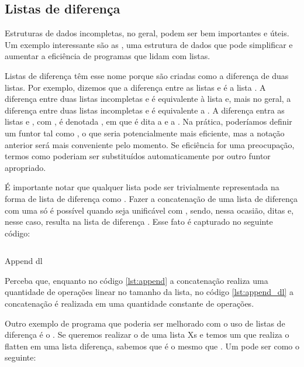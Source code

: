 \documentclass{article}
\begin{document}
\subsection{Listas de diferença}

Estruturas de dados incompletas, no geral, podem ser bem importantes e
úteis. Um exemplo interessante são as ,
uma estrutura de dados que pode simplificar e aumentar a eficiência de
programas que lidam com listas.

Listas de diferença têm esse nome porque são criadas como a diferença
de duas listas. Por exemplo, dizemos que a diferença entre as listas
\codigo{[a,b,c]} e \codigo{[c]} é a lista \codigo{[a,b]}. A diferença
entre duas listas incompletas \codigo{[a,b|Xs]} e  é
equivalente à lista \codigo{[a,b]} e, mais no geral, a diferença entre
duas listas incompletas \codigo{[$x_0$, ...,$x_i$|Xs]} e  é
equivalente a \codigo{[$x_0$, ...,$x_i$]}.  A diferença entra as
listas  e , com , é denotada
, em que  é dita a  e
 a . Na prática, poderíamos definir um
funtor tal como , o que seria potencialmente
mais eficiente, mas a notação anterior será mais conveniente pelo
momento. Se eficiência for uma preocupação, termos como
 poderiam ser substituídos automaticamente por
outro funtor apropriado.

É importante notar que qualquer lista  pode ser trivialmente
representada na forma de lista de diferença como
. Fazer a concatenação de uma lista de
diferença  com uma  só
é possível quando  seja unificável com , sendo, nessa
ocasião, ditas  e, nesse caso, resulta
na lista de diferença . Esse fato é capturado
no seguinte código:

\begin{listing}
  \inputminted{prolog}{../Exemplos/Cap3/prog5_concatenate_diff.pl}
  \caption{Append dl}\label{lst:append_dl}
\end{listing}

Perceba que, enquanto no código \ref{lst:append} a concatenação
realiza uma quantidade de operações linear no tamanho da lista, no
código \ref{lst:append_dl} a concatenação é realizada em uma
quantidade constante de operações.

Outro exemplo de programa que poderia ser melhorado com o uso de
listas de diferença é o . Se queremos realizar o
 de uma lista Xs e temos um 
que realiza o flatten em uma lista diferença, sabemos que
 é o mesmo que
. Um
 pode ser como o seguinte:
\end{document}
